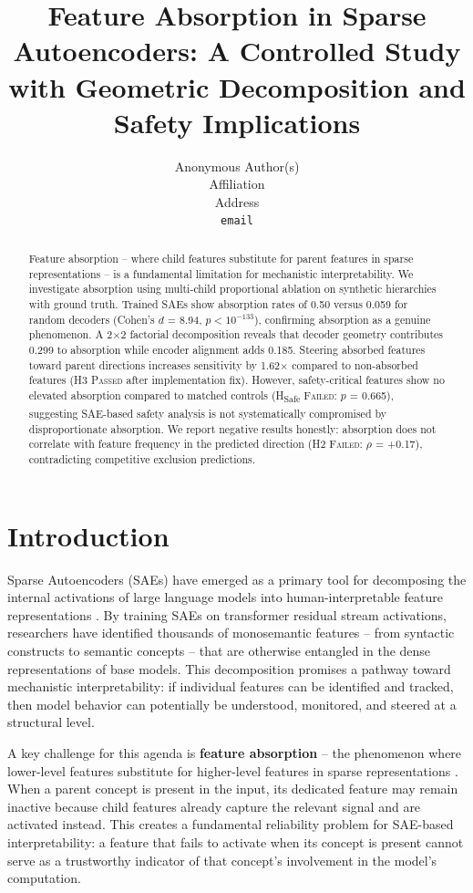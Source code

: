 \documentclass{article}
\title{Feature Absorption in Sparse Autoencoders: A Controlled Study with Geometric Decomposition and Safety Implications}
\author{%
  Anonymous Author(s) \\
  Affiliation \\
  Address \\
  \texttt{email} \\
}
\begin{document}
\maketitle

\begin{abstract}
Feature absorption -- where child features substitute for parent features in sparse representations -- is a fundamental limitation for mechanistic interpretability. We investigate absorption using multi-child proportional ablation on synthetic hierarchies with ground truth. Trained SAEs show absorption rates of 0.50 versus 0.059 for random decoders (Cohen's $d$ = 8.94, $p < 10^{-133}$), confirming absorption as a genuine phenomenon. A 2$\times$2 factorial decomposition reveals that decoder geometry contributes 0.299 to absorption while encoder alignment adds 0.185. Steering absorbed features toward parent directions increases sensitivity by 1.62$\times$ compared to non-absorbed features (H3 \textsc{Passed} after implementation fix). However, safety-critical features show no elevated absorption compared to matched controls (H\textsubscript{Safe} \textsc{Failed}: $p$ = 0.665), suggesting SAE-based safety analysis is not systematically compromised by disproportionate absorption. We report negative results honestly: absorption does not correlate with feature frequency in the predicted direction (H2 \textsc{Failed}: $\rho$ = +0.17), contradicting competitive exclusion predictions.
\end{abstract}

\section{Introduction}

Sparse Autoencoders (SAEs) have emerged as a primary tool for decomposing the internal activations of large language models into human-interpretable feature representations \citep{bricken2023, templeton2024}. By training SAEs on transformer residual stream activations, researchers have identified thousands of monosemantic features -- from syntactic constructs to semantic concepts -- that are otherwise entangled in the dense representations of base models. This decomposition promises a pathway toward mechanistic interpretability: if individual features can be identified and tracked, then model behavior can potentially be understood, monitored, and steered at a structural level.

A key challenge for this agenda is \textbf{feature absorption} -- the phenomenon where lower-level features substitute for higher-level features in sparse representations \citep{chanin2024}. When a parent concept is present in the input, its dedicated feature may remain inactive because child features already capture the relevant signal and are activated instead. This creates a fundamental reliability problem for SAE-based interpretability: a feature that fails to activate when its concept is present cannot serve as a trustworthy indicator of that concept's involvement in the model's computation.
\end{document}
